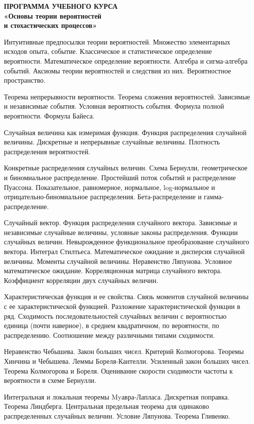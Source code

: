 \begin{center}

\textbf{ПРОГРАММА УЧЕБНОГО КУРСА  \\ 
«Основы теории вероятностей  \\
 и стохастических процессов»  \\}
 

\end{center}
 
 
Интуитивные предпосылки теории вероятностей. Множество элементарных исходов опыта, событие. Классическое и статистическое определение вероятности. Математическое определение вероятности. Алгебра и сигма-алгебра событий. Аксиомы теории вероятностей и следствия из них. Вероятностное пространство.

Теорема непрерывности вероятности. Теорема сложения вероятностей. Зависимые и независимые события. Условная вероятность события. Формула полной вероятности. Формула Байеса.

Случайная величина как измеримая функция. Функция распределения случайной величины. Дискретные и непрерывные случайные величины. Плотность распределения вероятностей.

Конкретные распределения случайных величин. Схема Бернулли, геометрическое и биномиальное распределение. Простейший поток событий и распределение Пуассона. Показательное, равномерное, нормальное, log-нормальное и отрицательно-биномиальное распределения. Бета-распределение и гамма-распределение.

Случайный вектор. Функция распределения случайного вектора. Зависимые и независимые случайные величины, условные законы распределения. Функции случайных величин. Невырожденное функциональное преобразование случайного вектора.
Интеграл Стилтьеса. Математическое ожидание и дисперсия случайной величины. Моменты случайной величины. Неравенство Ляпунова. Условное математическое ожидание. Корреляционная матрица случайного вектора. Коэффициент корреляции двух случайных величин.

Характеристическая функция и ее свойства. Связь моментов случайной величины с ее характеристической функцией. Разложение характеристической функции в ряд.
Сходимость последовательностей случайных величин с вероятностью единица (почти наверное), в среднем квадратичном, по вероятности, по распределению. Соотношение между различными типами сходимости.

Неравенство Чебышева. Закон больших чисел. Критерий Колмогорова. Теоремы Хинчина и Чебышева. Леммы Бореля-Кантелли. Усиленный закон больших чисел. Теорема Колмогорова и Бореля. Оценивание скорости сходимости частоты к вероятности в схеме Бернулли.

Интегральная и локальная теоремы Myавра-Лапласа. Дискретная поправка. Теорема Линдберга. Центральная предельная теорема для одинаково распределенных случайных величин. Условие Ляпунова. Теорема Гливенко.
